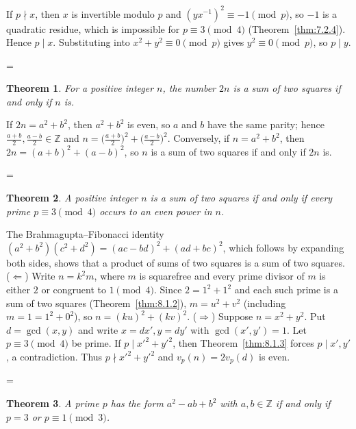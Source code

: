 \documentclass[11pt]{article}
\makeatletter
\theoremstyle{ntstyle}
\newtheorem{theorem}{Theorem}[subsection]
\let\nt@closedisplay\]
\def\nt@guardedclose{\@ifnextchar\par{\nt@closeafterpar}{\@ifnextchar\end{\postdisplaypenalty\@M\nt@closedisplay}{\nt@closedisplay}}}
\def\nt@closeafterpar\par{\@ifnextchar\par{\nt@closeafterpar}{\@ifnextchar\end{\postdisplaypenalty\@M\nt@closedisplay\par}{\nt@closedisplay\par}}}
\renewenvironment{proof}[1][\proofname]{\par
  \pushQED{\qed}\normalfont\topsep\medskipamount\edef\nt@afterproof{\@endparpenalty=\the\@endparpenalty\relax}\@beginparpenalty\@M\@endparpenalty\@M\let\]\nt@guardedclose\trivlist\item[]\textit{#1\@addpunct{.}} \ignorespaces}{\ifvmode\addpenalty\@M\fi\popQED\nt@afterproof\endtrivlist\@endpefalse}
\makeatother
\begin{document}
\begin{proof} If $p \nmid x$, then $x$ is invertible
	modulo $p$ and $(y x^{-1})^2 \equiv -1 \pmod{p}$, so $-1$ is a
	quadratic residue, which is impossible for $p \equiv 3 \pmod{4}$ (Theorem~\ref{thm:7.2.4}).
	Hence $p \mid x$. Substituting into $x^2+y^2\equiv0\pmod{p}$ gives
	$y^2\equiv0\pmod{p}$, so $p\mid y$.

\end{proof}
\begin{theorem}\label{thm:8.1.4} For a positive
	integer $n$, the number $2n$ is a sum of two squares if and only if $n$ is.

\end{theorem}

\begin{proof} If $2n = a^{2} + b^{2}$, then $a^{2} +
		b^{2}$ is even, so $a$ and $b$ have the same parity; hence
	$\tfrac{a+b}{2}, \tfrac{a-b}{2} \in \mathbb{Z}$ and $n =
		\big(\tfrac{a+b}{2}\big)^{2} + \big(\tfrac{a-b}{2}\big)^{2}$.
	Conversely, if $n = a^{2} + b^{2}$, then $2n = (a+b)^{2} + (a-b)^{2}$,
	so $n$ is a sum of two squares if and only if $2n$ is.

\end{proof}
\begin{theorem}\label{thm:8.1.5} A positive
	integer $n$ is a sum of two squares if and only if every prime $p
		\equiv 3 \pmod{4}$ occurs to an even power in $n$.

\end{theorem}

\begin{proof} The Brahmagupta--Fibonacci identity $(a^2 +
		b^2)(c^2 + d^2) = (ac - bd)^2 + (ad + bc)^2$, which follows by expanding both sides, shows that a product of sums
	of two squares is a sum of two squares. ($\Leftarrow$) Write $n=k^2m$, where $m$ is squarefree and every prime divisor
	of $m$ is either $2$ or congruent to $1\pmod{4}$. Since $2
		= 1^2 + 1^2$ and each such prime is a sum of two squares (Theorem~\ref{thm:8.1.2}), $m = u^2 + v^2$ (including $m=1=1^2+0^2$), so $n = (ku)^2 + (kv)^2$. ($\Rightarrow$) Suppose
	$n = x^2 + y^2$. Put $d = \gcd(x, y)$ and write $x = dx', y = dy'$ with $\gcd(x', y') = 1$. Let $p \equiv 3 \pmod{4}$ be prime. If $p \mid x'^2 + y'^2$, then Theorem~\ref{thm:8.1.3} forces $p \mid x', y'$, a contradiction. Thus $p \nmid x'^2 + y'^2$
	and $v_p(n) = 2v_p(d)$ is even.\qedhere

\end{proof}
\begin{theorem}\label{thm:8.1.6} A
	prime $p$ has the form $a^2 - ab + b^2$ with $a, b \in \mathbb{Z}$ if
	and only if $p = 3$ or $p \equiv 1 \pmod{3}$.

\end{theorem}
\end{document}
